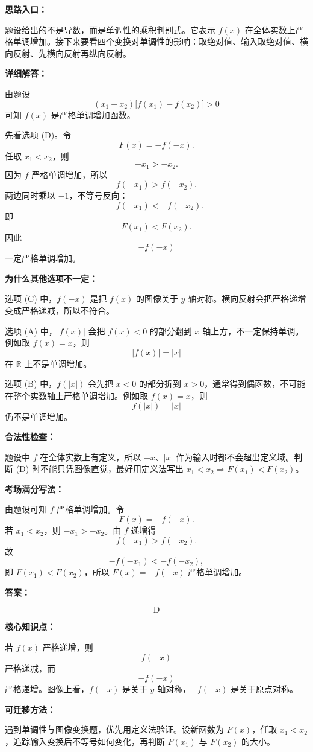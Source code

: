 \begin{solutionBox}
\textbf{思路入口：}

题设给出的不是导数，而是单调性的乘积判别式。它表示 \(f(x)\) 在全体实数上严格单调增加。接下来要看四个变换对单调性的影响：取绝对值、输入取绝对值、横向反射、先横向反射再纵向反射。

\textbf{详细解答：}

由题设
\[
(x_1-x_2)\bigl[f(x_1)-f(x_2)\bigr]>0
\]
可知 \(f(x)\) 是严格单调增加函数。

先看选项 (D)。令
\[
F(x)=-f(-x).
\]
任取 \(x_1<x_2\)，则
\[
-x_1>-x_2.
\]
因为 \(f\) 严格单调增加，所以
\[
f(-x_1)>f(-x_2).
\]
两边同时乘以 \(-1\)，不等号反向：
\[
-f(-x_1)<-f(-x_2).
\]
即
\[
F(x_1)<F(x_2).
\]
因此
\[
-f(-x)
\]
一定严格单调增加。

\textbf{为什么其他选项不一定：}

选项 (C) 中，\(f(-x)\) 是把 \(f(x)\) 的图像关于 \(y\) 轴对称。横向反射会把严格递增变成严格递减，所以不符合。

选项 (A) 中，\(|f(x)|\) 会把 \(f(x)<0\) 的部分翻到 \(x\) 轴上方，不一定保持单调。例如取 \(f(x)=x\)，则
\[
|f(x)|=|x|
\]
在 \(\mathbb{R}\) 上不是单调增加。

选项 (B) 中，\(f(|x|)\) 会先把 \(x<0\) 的部分折到 \(x>0\)，通常得到偶函数，不可能在整个实数轴上严格单调增加。例如取 \(f(x)=x\)，则
\[
f(|x|)=|x|
\]
仍不是单调增加。

\textbf{合法性检查：}

题设中 \(f\) 在全体实数上有定义，所以 \(-x\)、\(|x|\) 作为输入时都不会超出定义域。判断 (D) 时不能只凭图像直觉，最好用定义法写出 \(x_1<x_2\Rightarrow F(x_1)<F(x_2)\)。

\textbf{考场满分写法：}

由题设可知 \(f\) 严格单调增加。令
\[
F(x)=-f(-x).
\]
若 \(x_1<x_2\)，则 \(-x_1>-x_2\)。由 \(f\) 递增得
\[
f(-x_1)>f(-x_2).
\]
故
\[
-f(-x_1)<-f(-x_2),
\]
即 \(F(x_1)<F(x_2)\)，所以 \(F(x)=-f(-x)\) 严格单调增加。

\textbf{答案：}

\[
\boxed{\text{D}}
\]
\end{solutionBox}

\begin{knowledgeBox}
\textbf{核心知识点：}

若 \(f(x)\) 严格递增，则
\[
f(-x)
\]
严格递减，而
\[
-f(-x)
\]
严格递增。图像上看，\(f(-x)\) 是关于 \(y\) 轴对称，\(-f(-x)\) 是关于原点对称。

\textbf{可迁移方法：}

遇到单调性与图像变换题，优先用定义法验证。设新函数为 \(F(x)\)，任取 \(x_1<x_2\)，追踪输入变换后不等号如何变化，再判断 \(F(x_1)\) 与 \(F(x_2)\) 的大小。
\end{knowledgeBox}

